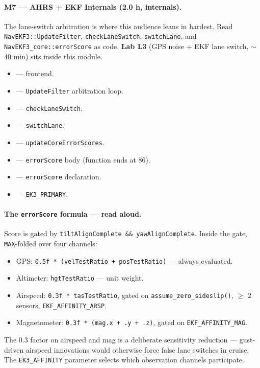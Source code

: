 \documentclass[a4paper,11pt,twoside]{article}
\begin{document}
\paragraph{M7 --- AHRS + EKF Internals (2.0 h, internals).}
The lane-switch arbitration is where this audience leans in hardest. Read \texttt{NavEKF3::UpdateFilter}, \texttt{checkLaneSwitch}, \texttt{switchLane}, and \texttt{NavEKF3\_core::errorScore} as code. \textbf{Lab L3} (GPS noise + EKF lane switch, $\sim$40 min) sits inside this module.
\begin{itemize}
  \item {} --- frontend.
  \item {} --- \texttt{UpdateFilter} arbitration loop.
  \item {} --- \texttt{checkLaneSwitch}.
  \item {} --- \texttt{switchLane}.
  \item {} --- \texttt{updateCoreErrorScores}.
  \item {} --- \texttt{errorScore} body (function ends at 86).
  \item {} --- \texttt{errorScore} declaration.
  \item {} --- \texttt{EK3\_PRIMARY}.
\end{itemize}

\paragraph{The \texttt{errorScore} formula --- read aloud.}
Score is gated by \texttt{tiltAlignComplete \&\& yawAlignComplete}. Inside the gate, \texttt{MAX}-folded over four channels:
\begin{itemize}
  \item GPS: \texttt{0.5f * (velTestRatio + posTestRatio)} --- always evaluated.
  \item Altimeter: \texttt{hgtTestRatio} --- unit weight.
  \item Airspeed: \texttt{0.3f * tasTestRatio}, gated on \texttt{assume\_zero\_sideslip()}, $\geq$ 2 sensors, \texttt{EKF\_AFFINITY\_ARSP}.
  \item Magnetometer: \texttt{0.3f * (mag.x + .y + .z)}, gated on \texttt{EKF\_AFFINITY\_MAG}.
\end{itemize}
The 0.3 factor on airspeed and mag is a deliberate sensitivity reduction --- gust-driven airspeed innovations would otherwise force false lane switches in cruise. The \texttt{EK3\_AFFINITY} parameter selects which observation channels participate.
\end{document}
